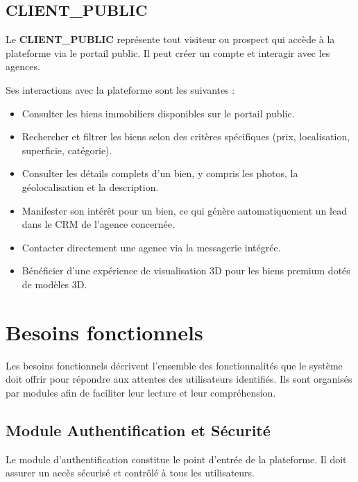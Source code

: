 \documentclass[a4paper,12pt]{report}
\begin{document}
\subsection{CLIENT\_PUBLIC}

Le \textbf{CLIENT\_PUBLIC} représente tout visiteur ou prospect qui accède à la plateforme via le portail public. Il peut créer un compte et interagir avec les agences.

Ses interactions avec la plateforme sont les suivantes :

\begin{itemize}
    \item Consulter les biens immobiliers disponibles sur le portail public.
    \item Rechercher et filtrer les biens selon des critères spécifiques (prix, localisation, superficie, catégorie).
    \item Consulter les détails complets d'un bien, y compris les photos, la géolocalisation et la description.
    \item Manifester son intérêt pour un bien, ce qui génère automatiquement un lead dans le CRM de l'agence concernée.
    \item Contacter directement une agence via la messagerie intégrée.
    \item Bénéficier d'une expérience de visualisation 3D pour les biens premium dotés de modèles 3D.
\end{itemize}


\section{Besoins fonctionnels}

Les besoins fonctionnels décrivent l'ensemble des fonctionnalités que le système doit offrir pour répondre aux attentes des utilisateurs identifiés. Ils sont organisés par modules afin de faciliter leur lecture et leur compréhension.

\subsection{Module Authentification et Sécurité}

Le module d'authentification constitue le point d'entrée de la plateforme. Il doit assurer un accès sécurisé et contrôlé à tous les utilisateurs.
\end{document}
